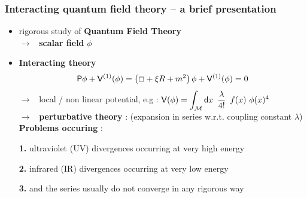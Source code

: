 \documentclass[9pt]{beamer}
\newcommand{\Mcal}{\mathcal{M}}
\newcommand{\Psf}{\mathsf{P}}
\newcommand{\Vsf}{\mathsf{V}}
\newcommand{\dsf}{\mathsf{d}}
\begin{document}
\begin{frame}
 
\frametitle{Interacting quantum field theory -- a brief presentation}

\vfill

\begin{itemize}

\item rigorous study of \textbf{Quantum Field Theory}\\
$\to$ \ \textbf{scalar field} $\phi$

\item \textbf{Interacting theory}
%
\vspace*{-5pt}
\begin{equation*} 
\Psf \phi + \Vsf^{(1)}(\phi) = \left( \Box + \xi R + m^2 \right) \phi + \Vsf^{(1)}(\phi)  = 0
\vspace*{-5pt}
\end{equation*}
%
$\to$ \ local / non linear potential, e.g : $\Vsf(\phi) = \mathop{\mathlarger{\int_{\Mcal}}} \dsf x \ \mathop{\mathlarger{\frac{\lambda}{4!}}} \ f(x) \ \phi(x)^4$ \\[4pt]

$\to$ \ \textbf{perturbative theory} : (expansion in series w.r.t. coupling constant $\lambda$) \\[6pt]

\textbf{Problems occuring} : \par

\vspace*{-12pt}
\begin{block}{\vspace*{-3ex}}
\vspace*{-5pt}\hspace*{12pt}%
\textbf{1.} ultraviolet (UV) divergences occurring at very high energy
\end{block}
\vspace*{-5pt}
\textbf{2.} infrared (IR) divergences occurring at very low energy

\textbf{3.} and the series usually do not converge in any rigorous way

\end{itemize}

\vfill

\end{frame}

\end{document}
